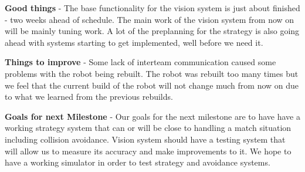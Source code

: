 \documentclass[12pt, a4paper]{article} %
\begin{document}
\textbf{Good things} - The base functionality for the vision system is just
about finished - two weeks ahead of schedule. The main work of the vision
system from now on will be mainly tuning work. A lot of the preplanning for the
strategy is also going ahead with systems starting to get implemented, well
before we need it.

\textbf{Things to improve} - Some lack of interteam communication caused some
problems with the robot being rebuilt. The robot was rebuilt too many times but we
feel that the current build of the robot will not change much from now on due
to what we learned from the previous rebuilds.

\textbf{Goals for next Milestone} - Our goals for the next milestone are to
have have a working strategy system that can or will be close to handling
a match situation including collision avoidance. Vision system should have
a testing system that will allow us to measure its accuracy and make
improvements to it. We hope to have a working simulator in order to test
strategy and avoidance systems.
\end{document}
